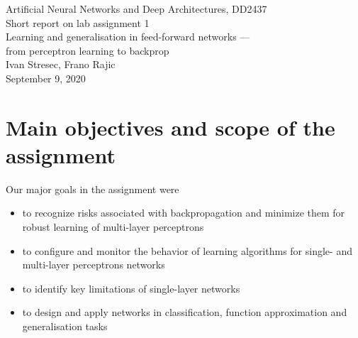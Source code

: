 \documentclass[a4paper]{article}
\begin{document}
\begin{center}
  {\large Artificial Neural Networks and Deep Architectures, DD2437}\\
  \vspace{7mm}
  {\huge Short report on lab assignment 1\\[1ex]}
  {\Large Learning and generalisation in feed-forward networks ---\\[1ex]
 from perceptron learning to backprop}\\
  \vspace{8mm}  
  {\Large Ivan Stresec, Frano Rajic\\}
  \vspace{4mm}
  {\large September 9, 2020\\}
\end{center}


\section{Main objectives and scope of the assignment}

Our major goals in the assignment were  
\begin{itemize}
\item to recognize risks associated with backpropagation and minimize them for
robust learning of multi-layer perceptrons
\item to configure and monitor the behavior of learning algorithms for single- and
multi-layer perceptrons networks
\item to identify key limitations of single-layer networks
\item to design and apply networks in classification, function approximation and generalisation tasks
\end{itemize}
\end{document}
